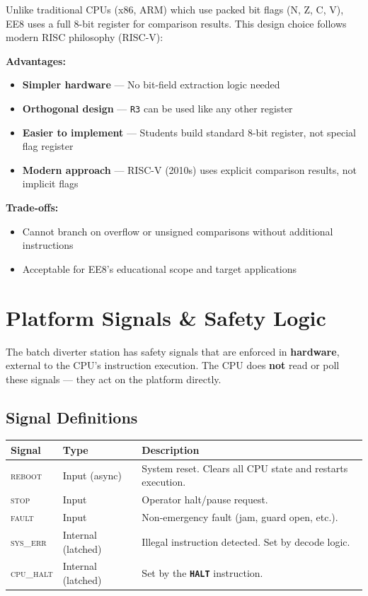 \documentclass[11pt,a4paper]{article}
\newcommand{\reg}[1]{\texttt{R#1}}
\newcommand{\signal}[1]{\textsc{#1}}
\newcommand{\instr}[1]{\texttt{\textbf{#1}}}
\begin{document}
\begin{designnote}
Unlike traditional CPUs (x86, ARM) which use packed bit flags (N, Z, C, V), EE8 uses a full 8-bit register for comparison results. This design choice follows modern RISC philosophy (RISC-V):

\textbf{Advantages:}
\begin{itemize}[nosep]
  \item \textbf{Simpler hardware} --- No bit-field extraction logic needed
  \item \textbf{Orthogonal design} --- \reg{3} can be used like any other register
  \item \textbf{Easier to implement} --- Students build standard 8-bit register, not special flag register
  \item \textbf{Modern approach} --- RISC-V (2010s) uses explicit comparison results, not implicit flags
\end{itemize}

\textbf{Trade-offs:}
\begin{itemize}[nosep]
  \item Cannot branch on overflow or unsigned comparisons without additional instructions
  \item Acceptable for EE8's educational scope and target applications
\end{itemize}
\end{designnote}

\section{Platform Signals \& Safety Logic}

The batch diverter station has safety signals that are enforced in \textbf{hardware}, external to the CPU's instruction execution. The CPU does \textbf{not} read or poll these signals --- they act on the platform directly.

\subsection{Signal Definitions}

\begin{table}[H]
\centering
\begin{tabularx}{\textwidth}{@{}llX@{}}
\toprule
\textbf{Signal} & \textbf{Type} & \textbf{Description} \\
\midrule
\signal{reboot}  & Input (async) & System reset. Clears all CPU state and restarts execution. \\
\signal{stop}    & Input         & Operator halt/pause request. \\
\signal{fault}   & Input         & Non-emergency fault (jam, guard open, etc.). \\
\signal{sys\_err} & Internal (latched) & Illegal instruction detected. Set by decode logic. \\
\signal{cpu\_halt} & Internal (latched) & Set by the \instr{HALT} instruction. \\
\bottomrule
\end{tabularx}
\end{table}
\end{document}
